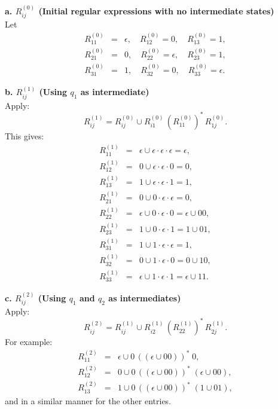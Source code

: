 \documentclass{article}
\theoremstyle{theorem}
\theoremstyle{definition}
\theoremstyle{remark}
\begin{document}
\medskip

\textbf{a. \(R_{ij}^{(0)}\) (Initial regular expressions with no intermediate states)}\\[1mm]
Let
\[
\begin{array}{rcl}
R_{11}^{(0)} &=& \epsilon, \quad R_{12}^{(0)} = 0, \quad R_{13}^{(0)} = 1,\\[1mm]
R_{21}^{(0)} &=& 0, \quad R_{22}^{(0)} = \epsilon, \quad R_{23}^{(0)} = 1,\\[1mm]
R_{31}^{(0)} &=& 1, \quad R_{32}^{(0)} = 0, \quad R_{33}^{(0)} = \epsilon.
\end{array}
\]

\medskip

\textbf{b. \(R_{ij}^{(1)}\) (Using \(q_1\) as intermediate)}\\[1mm]
Apply:
\[
R_{ij}^{(1)} = R_{ij}^{(0)} \cup R_{i1}^{(0)}\,(R_{11}^{(0)})^*\,R_{1j}^{(0)}.
\]
This gives:
\[
\begin{array}{rcl}
R_{11}^{(1)} &=& \epsilon \cup \epsilon\cdot\epsilon\cdot\epsilon = \epsilon,\\[1mm]
R_{12}^{(1)} &=& 0 \cup \epsilon\cdot\epsilon\cdot 0 = 0,\\[1mm]
R_{13}^{(1)} &=& 1 \cup \epsilon\cdot\epsilon\cdot 1 = 1,\\[1mm]
R_{21}^{(1)} &=& 0 \cup 0\cdot\epsilon\cdot\epsilon = 0,\\[1mm]
R_{22}^{(1)} &=& \epsilon \cup 0\cdot\epsilon\cdot 0 = \epsilon \cup 00,\\[1mm]
R_{23}^{(1)} &=& 1 \cup 0\cdot\epsilon\cdot 1 = 1 \cup 01,\\[1mm]
R_{31}^{(1)} &=& 1 \cup 1\cdot\epsilon\cdot\epsilon = 1,\\[1mm]
R_{32}^{(1)} &=& 0 \cup 1\cdot\epsilon\cdot 0 = 0 \cup 10,\\[1mm]
R_{33}^{(1)} &=& \epsilon \cup 1\cdot\epsilon\cdot 1 = \epsilon \cup 11.
\end{array}
\]

\medskip

\textbf{c. \(R_{ij}^{(2)}\) (Using \(q_1\) and \(q_2\) as intermediates)}\\[1mm]
Apply:
\[
R_{ij}^{(2)} = R_{ij}^{(1)} \cup R_{i2}^{(1)}\,(R_{22}^{(1)})^*\,R_{2j}^{(1)}.
\]
For example:
\[
\begin{array}{rcl}
R_{11}^{(2)} &=& \epsilon \cup 0\,( (\epsilon \cup 00) )^*\;0,\\[1mm]
R_{12}^{(2)} &=& 0 \cup 0\,( (\epsilon \cup 00) )^*\;(\epsilon \cup 00),\\[1mm]
R_{13}^{(2)} &=& 1 \cup 0\,( (\epsilon \cup 00) )^*\;(1 \cup 01),
\end{array}
\]
and in a similar manner for the other entries.
\end{document}
